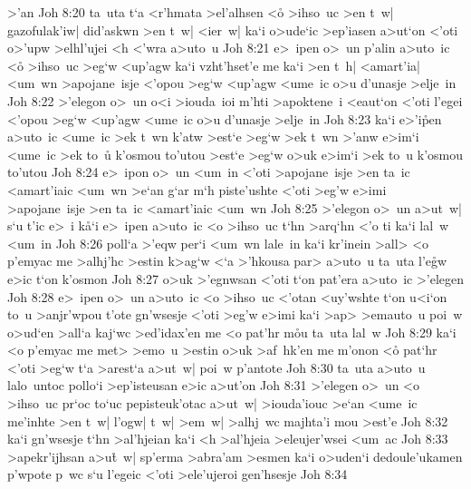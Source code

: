 >'an\bibvsend
\vs Joh 8:20
ta~uta
t`a
<r'hmata
>el'alhsen
<o\r{}
>ihso~uc
>en
t~w|
gazofulak'iw|
did'askwn
>en
t~w|
<ier~w|
ka`i
o>ude`ic
>ep'iasen
a>ut`on
<'oti
o>'upw
>elhl'ujei
<h
<'wra
a>uto~u\bibvsend
\vs Joh 8:21
e>~ipen
o>~un
p'alin
a>uto~ic
<o\r{}
>ihso~uc
>eg`w
<up'agw
ka`i
vzht'hset'e
me
ka`i
>en
t~h|
<amart'ia|
<um~wn
>apojane~isje
<'opou
>eg`w
<up'agw
<ume~ic
o>u
d'unasje
>elje~in\bibvsend
\vs Joh 8:22
>'elegon
o>~un
o<i
>iouda~ioi
m'hti
>apoktene~i
<eaut`on
<'oti
l'egei
<'opou
>eg`w
<up'agw
<ume~ic
o>u
d'unasje
>elje~in\bibvsend
\vs Joh 8:23
ka`i
e>'i\r{p}en
a>uto~ic
<ume~ic
>ek
t~wn
k'atw
>est`e
>eg`w
>ek
t~wn
>'anw
e>im`i
<ume~ic
>ek
to~u\r{}
k'osmou
to'utou
>est`e
>eg`w
o>uk
e>im`i
>ek
to~u
k'osmou
to'utou\bibvsend
\vs Joh 8:24
e>~ipon
o>~un
<um~in
<'oti
>apojane~isje
>en
ta~ic
<amart'iaic
<um~wn
>e`an
g`ar
m`h
piste'ushte
<'oti
>eg'w
e>imi
>apojane~isje
>en
ta~ic
<amart'iaic
<um~wn\bibvsend
\vs Joh 8:25
>'elegon
o>~un
a>ut~w|
s`u
t'ic
e>~i
k\r{a}`i
e>~ipen
a>uto~ic
<o
>ihso~uc
t`hn
>arq`hn
<'o
ti
ka`i
lal~w
<um~in\bibvsend
\vs Joh 8:26
poll`a
>'eqw
per`i
<um~wn
lale~in
ka`i
kr'inein
>all>
<o
p'emyac
me
>alhj'hc
>estin
k>ag`w
<`a
>'hkousa
par>
a>uto~u
ta~uta
l'e\r{g}w
e>ic
t`on
k'osmon\bibvsend
\vs Joh 8:27
o>uk
>'egnwsan
<'oti
t`on
pat'era
a>uto~ic
>'elegen\bibvsend
\vs Joh 8:28
e>~ipen
o>~un
a>uto~ic
<o
>ihso~uc
<'otan
<uy'wshte
t`on
u<i`on
to~u
>anjr'wpou
t'ote
gn'wsesje
<'oti
>eg'w
e>imi
ka`i
>ap>
>emauto~u
poi~w
o>ud`en
>all`a
kaj`wc
>ed'idax'en
me
<o
pat'hr
m\r{o}u
ta~uta
lal~w\bibvsend
\vs Joh 8:29
ka`i
<o
p'emyac
me
met>
>emo~u
>estin
o>uk
>af~hk'en
me
m'onon
<o\r{}
pat`hr
<'oti
>eg`w
t`a
>arest`a
a>ut~w|
poi~w
p'antote\bibvsend
\vs Joh 8:30
ta~uta
a>uto~u
lalo~untoc
pollo`i
>ep'isteusan
e>ic
a>ut'on\bibvsend
\vs Joh 8:31
>'elegen
o>~un
<o
>ihso~uc
pr`oc
to`uc
pepisteuk'otac
a>ut~w|
>iouda'iouc
>e`an
<ume~ic
me'inhte
>en
t~w|
l'ogw|
t~w|
>em~w|
>alhj~wc
majhta'i
mou
>est'e\bibvsend
\vs Joh 8:32
ka`i
gn'wsesje
t`hn
>al'hjeian
ka`i
<h
>al'hjeia
>eleujer'wsei
<um~ac\bibvsend
\vs Joh 8:33
>apekr'ijhsan
a>u\r{t}~w|
sp'erma
>abra'am
>esmen
ka`i
o>uden`i
dedoule'ukamen
p'wpote
p~wc
s`u
l'egeic
<'oti
>ele'ujeroi
gen'hsesje\bibvsend
\vs Joh 8:34
